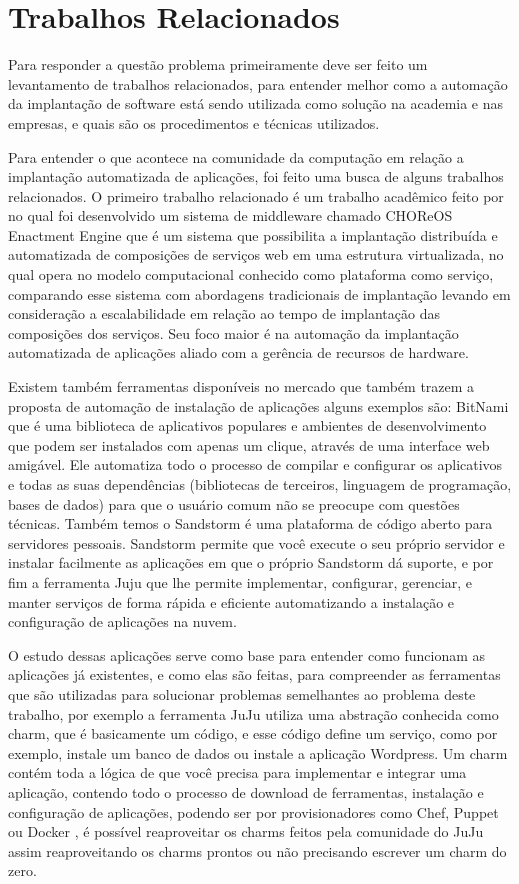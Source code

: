 \section{Trabalhos Relacionados}
\label{section:trabalhos_relacionados}
Para responder a questão problema primeiramente deve ser feito um levantamento
de trabalhos relacionados, para entender melhor como a automação da implantação
de software está sendo utilizada como solução na academia e nas empresas, e
quais são os procedimentos e técnicas utilizados.

Para entender o que acontece na comunidade da computação em relação a implantação
automatizada de aplicações, foi feito uma busca de alguns trabalhos relacionados. O primeiro
trabalho relacionado é um trabalho acadêmico feito por \cite{leo2014} no qual foi
desenvolvido um sistema de middleware chamado CHOReOS Enactment Engine que é um
sistema que possibilita a implantação distribuída e automatizada de composições
de serviços web em uma estrutura virtualizada, no qual opera no modelo
computacional conhecido como plataforma como serviço, comparando esse sistema
com abordagens tradicionais de implantação levando em consideração a escalabilidade
em relação ao tempo de implantação das composições dos serviços. Seu foco maior
é na automação da implantação automatizada de aplicações aliado com a gerência de recursos
de hardware.

Existem também ferramentas disponíveis no mercado que também trazem a proposta
de automação de instalação de aplicações alguns exemplos são: \cite{bitnami}
BitNami que é uma biblioteca de aplicativos populares e ambientes de
desenvolvimento que podem ser instalados com apenas um clique, através de uma interface web
amigável. Ele automatiza todo o
processo de compilar e configurar os aplicativos e todas as suas dependências
(bibliotecas de terceiros, linguagem de programação, bases de dados) para que o
usuário comum não se preocupe com questões técnicas. Também temos o \cite{sandstormio}
Sandstorm é uma plataforma de código aberto para servidores
pessoais. Sandstorm permite que você execute o seu próprio servidor e instalar
facilmente as aplicações em que o próprio Sandstorm dá suporte, e por fim a ferramenta \cite{juju}
Juju que lhe permite implementar, configurar, gerenciar, e manter serviços de forma
rápida e eficiente automatizando a instalação e configuração de aplicações na nuvem.

O estudo dessas aplicações serve como base para entender como funcionam as aplicações
já existentes, e como elas são feitas, para compreender as ferramentas que são
utilizadas para solucionar problemas semelhantes ao problema deste
trabalho, por exemplo a ferramenta JuJu utiliza uma abstração conhecida como charm,
que é basicamente um código, e esse código define um serviço, como por exemplo,
instale um banco de dados ou instale a aplicação Wordpress. Um charm
contém toda a lógica de que você precisa para implementar e integrar uma aplicação,
contendo todo o processo de download de ferramentas, instalação e configuração de
aplicações, podendo ser por provisionadores como Chef, Puppet ou Docker \cite{juju},
é possível reaproveitar os charms feitos pela comunidade do JuJu assim
reaproveitando os charms prontos ou não precisando escrever um charm do zero.

